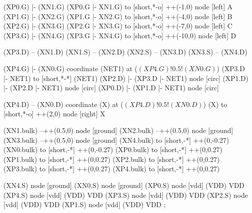 \begin{circuitikz}[american]
	
	(XP0.G) |- (XN1.G)
	(XP0.G |- XN1.G) to [short,*-o] ++(-1,0) node [left] {A}	
	(XP1.G) |- (XN2.G)
	(XP1.G |- XN2.G) to [short,*-o] ++(-4,0) node [left] {B}
	(XP2.G) |- (XN3.G)
	(XP2.G |- XN3.G) to [short,*-o] ++(-7,0) node [left] {C}
	(XP3.G) |- (XN4.G)
	(XP3.G |- XN4.G) to [short,*-o] ++(-10,0) node [left] {D}
	
	(XP3.D) -- (XN1.D)
	(XN1.S) -- (XN2.D)
	(XN2.S) -- (XN3.D)
	(XN3.S) -- (XN4.D)
	
	(XP4.G) |- (XN0.G)
	coordinate (NET1) at ($(XP4.G)!0.5!(XN0.G)$)
	(XP3.D |- NET1) to [short,*-*] (NET1) 
	(XP2.D) |- (XP3.D |- NET1) node [circ]{}
	(XP1.D) |- (XP2.D |- NET1) node [circ]{}
	(XP0.D) |- (XP1.D |- NET1) node [circ]{}
	
	(XP4.D) -- (XN0.D)
	coordinate (X) at ($(XP4.D)!0.5!(XN0.D)$)
	(X) to [short,*-o] ++(2,0) node [right] {X}
	
	(XN1.bulk) --++(0.5,0) node [ground]{}	
	(XN2.bulk) --++(0.5,0) node [ground]{}
	(XN3.bulk) --++(0.5,0) node [ground]{}
	(XN4.bulk) to [short,-*] ++(0,-0.27)
	(XN0.bulk) to [short,-*] ++(0,-0.27)
	(XP0.bulk) to [short,-*] ++(0,0.27)
	(XP1.bulk) to [short,-*] ++(0,0.27)
	(XP2.bulk) to [short,-*] ++(0,0.27)
	(XP3.bulk) to [short,-*] ++(0,0.27)
	(XP4.bulk) to [short,-*] ++(0,0.27)	


	(XN4.S) node [ground] {}
	(XN0.S) node [ground] {}
	(XP0.S) node [vdd] (VDD) {VDD}
	(XP4.S) node [vdd] (VDD) {VDD}
	(XP3.S) node [vdd] (VDD) {VDD}
	(XP2.S) node [vdd] (VDD) {VDD}
	(XP1.S) node [vdd] (VDD) {VDD}
;

\end{circuitikz}

